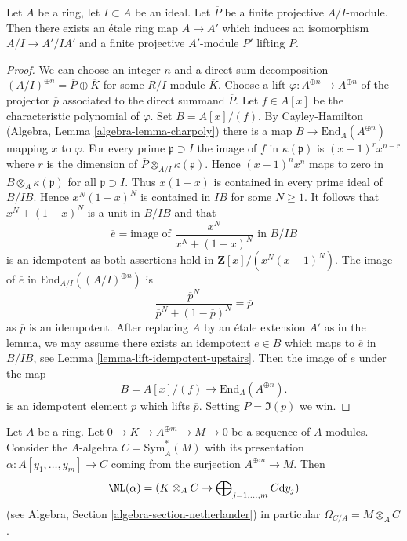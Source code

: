 \begin{lemma}
\label{lemma-lift-projective-module}
Let $A$ be a ring, let $I \subset A$ be an ideal.
Let $\overline{P}$ be a finite projective $A/I$-module.
Then there exists an \'etale ring map $A \to A'$ which induces
an isomorphism $A/I \to A'/IA'$ and a finite projective
$A'$-module $P'$ lifting $\overline{P}$.
\end{lemma}

\begin{proof}
We can choose an integer $n$ and a direct sum decomposition
$(A/I)^{\oplus n} = \overline{P} \oplus \overline{K}$
for some $R/I$-module $\overline{K}$. Choose a lift
$\varphi : A^{\oplus n} \to A^{\oplus n}$ of the projector $\overline{p}$
associated to the direct summand $\overline{P}$.
Let $f \in A[x]$ be the characteristic polynomial of $\varphi$.
Set $B = A[x]/(f)$. By Cayley-Hamilton
(Algebra, Lemma \ref{algebra-lemma-charpoly}) there is a map
$B \to \text{End}_A(A^{\oplus n})$ mapping $x$ to $\varphi$.
For every prime $\mathfrak p \supset I$ the image of $f$ in
$\kappa(\mathfrak p)$ is $(x - 1)^rx^{n - r}$ where $r$ is the
dimension of $\overline{P} \otimes_{A/I} \kappa(\mathfrak p)$.
Hence $(x - 1)^nx^n$ maps to zero in $B \otimes_A \kappa(\mathfrak p)$
for all $\mathfrak p \supset I$. Thus $x(1 - x)$ is contained
in every prime ideal of $B/IB$. Hence $x^N(1 - x)^N$ is
contained in $IB$ for some $N \geq 1$.
It follows that $x^N + (1 - x)^N$ is a unit in $B/IB$ and that
$$
\overline{e} = \text{image of }\frac{x^N}{x^N + (1 - x)^N}\text{ in }B/IB
$$
is an idempotent as both assertions hold in $\mathbf{Z}[x]/(x^N(x - 1)^N)$.
The image of $\overline{e}$ in $\text{End}_{A/I}((A/I)^{\oplus n})$ is
$$
\frac{\overline{p}^N}{\overline{p}^N + (1 - \overline{p})^N} = \overline{p}
$$
as $\overline{p}$ is an idempotent. After replacing $A$ by an \'etale
extension $A'$ as in the lemma, we may assume there exists an idempotent
$e \in B$ which maps to $\overline{e}$ in $B/IB$, see
Lemma \ref{lemma-lift-idempotent-upstairs}.
Then the image of $e$ under the map
$$
B = A[x]/(f) \longrightarrow \text{End}_A(A^{\oplus n}).
$$
is an idempotent element $p$ which lifts $\overline{p}$.
Setting $P = \Im(p)$ we win.
\end{proof}

\begin{lemma}
\label{lemma-cotangent-complex-symmetric-algebra}
Let $A$ be a ring. Let $0 \to K \to A^{\oplus m} \to M \to 0$
be a sequence of $A$-modules. Consider the $A$-algebra
$C = \text{Sym}^*_A(M)$ with its presentation
$\alpha : A[y_1, \ldots, y_m] \to C$
coming from the surjection $A^{\oplus m} \to M$. Then
$$
\NL(\alpha) =
(K \otimes_A C \to \bigoplus\nolimits_{j = 1, \ldots, m} C \text{d}y_j)
$$
(see Algebra, Section \ref{algebra-section-netherlander})
in particular $\Omega_{C/A} = M \otimes_A C$.
\end{lemma}

